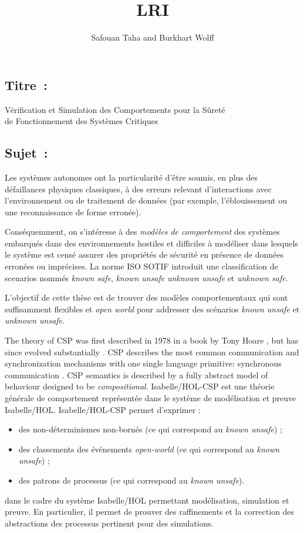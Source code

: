 \documentclass[a4paper,10pt]{article}
\begin{document}
\title{\textbf{LRI}}
\author{Safouan Taha and Burkhart Wolff}
\date{}

\maketitle

\subsection*{Titre~:}
\begin{center}
\large Vérification et Simulation des Comportements pour la Sûreté \\ de Fonctionnement des Systèmes Critiques
\end{center}

\subsection*{Sujet~:}
Les systèmes autonomes ont la particularité d'être soumis,
en plus des défaillances physiques classiques,
à des erreurs relevant d'interactions avec l'environnement
ou de traitement de données
(par exemple, l'éblouissement ou une reconnaissance de forme erronée).  

Conséquemment, on s'intéresse à des \emph{modèles de comportement}
des systèmes embarqués dans des environnements hostiles
et difficiles à modéliser
dans lesquels le système est censé assurer des propriétés de sécurité
en présence de données erronées ou imprécises.
La norme ISO SOTIF introduit une classification de scenarios
nommés \emph{known safe}, \emph{known unsafe} \emph{unknown unsafe} et
\emph{unknown safe}. 


L'objectif de cette thèse est de trouver des modèles comportementaux
qui sont suffisamment flexibles et \emph{open world}
pour addresser des scénarios \emph{known unsafe} et \emph{unknown unsafe}. 

The theory of CSP was first described in 1978 in a book by Tony Hoare \cite{Hoare:1985:CSP:3921}, 
but has since evolved substantially \cite{BrookesHR84,brookes-roscoe85,roscoe:csp:1998}.
CSP describes the most common communication and synchronization mechanisms
with one single language primitive: synchronous communication . 
CSP semantics is described by a fully abstract model of behaviour designed to be \emph{compositional}.
Isabelle/HOL-CSP\cite{XXX} est une théorie générale de comportement
représentée dans le système de modélisation et preuve Isabelle/HOL\cite{XXX}. Isabelle/HOL-CSP permet d'exprimer :
\begin{itemize}
\item
  des non-déterminismes non-bornés
  (ce qui correspond au \emph{known unsafe}) ; 
\item
  des classements des événements \emph{open-world}
  (ce qui correspond au \emph{known unsafe}) ;
\item
  des patrons de processus (ce qui correspond au \emph{known unsafe}).
\end{itemize}
dans le cadre du système Isabelle/HOL permettant
modélisation, simulation et preuve.
En particulier, il permet de prouver des raffinements et la correction des abstractions des processus pertinent pour des simulations.
\end{document}
